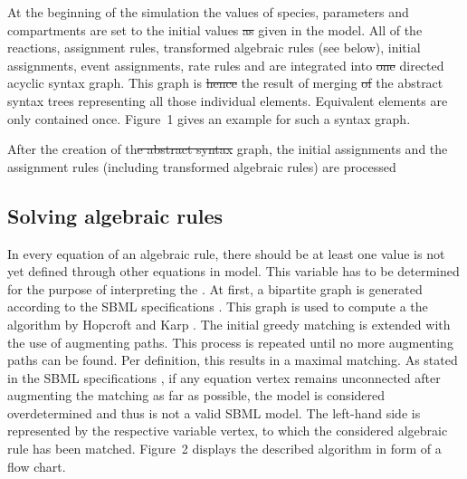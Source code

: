 \documentclass[10pt]{bmc_article}
\newenvironment{bmcformat}{\begin{raggedright}\baselineskip20pt\sloppy\setboolean{publ}{false}}{\end{raggedright}\baselineskip20pt\sloppy}
\begin{document}
\begin{bmcformat}
At the beginning of the simulation the values of species, parameters and
compartments are set to the initial values \sout{as} given in the model.
All  of the reactions, assignment rules, transformed algebraic
rules (see below), initial assignments, event assignments, rate rules and
 are integrated into \sout{one} directed
acyclic syntax graph.
This graph is \sout{hence}
the result of merging \sout{of} the abstract syntax trees representing
all those individual elements.
Equivalent elements are only contained once.
Figure~1 gives an example for such a syntax graph.

After the creation of th\sout{e abstract syntax} graph, the initial
assignments and the assignment rules (including transformed algebraic rules) are
processed 


\subsection*{Solving algebraic rules}
In every equation of an algebraic rule, there should be at least one  value is not yet defined through other equations in  model.
This variable has to be determined for the purpose of interpreting the . 
At first, a bipartite graph is generated according to the \acs{SBML} specifications \cite{Finney2006, Hucka2007, Hucka2008, Hucka2010a}.
This graph is used to compute a  the algorithm by Hopcroft
and Karp \cite{hopcroft1973n}.
The initial greedy matching is extended with the use of augmenting paths.
This process is repeated until no more augmenting paths can be found.
Per definition, this results in a maximal matching. 
As stated in the \acs{SBML} specifications \cite{Finney2006, Hucka2007, Hucka2008, Hucka2010a},
if any equation vertex remains unconnected after augmenting the matching as far as possible, the model is considered overdetermined and thus is not a valid \acs{SBML} model.
The left-hand side is represented by the respective variable vertex, to which the considered algebraic rule has been matched.
Figure~2 displays the described algorithm in  form of a flow chart.


\end{bmcformat}
\end{document}
